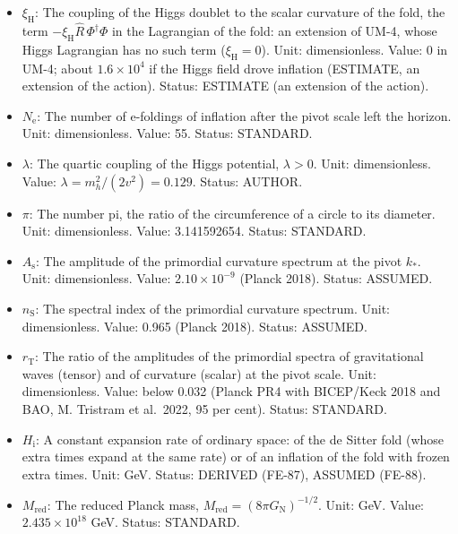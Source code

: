 \documentclass[
  10pt,
]{article}
\providecommand{\tightlist}{%
  \setlength{\itemsep}{0pt}\setlength{\parskip}{0pt}}
\begin{document}
\begin{itemize}
\tightlist
\item
  \(\xi_{\mathrm{H}}\): The coupling of the Higgs doublet to the scalar
  curvature of the fold, the term
  \(-\xi_{\mathrm{H}}\hat R\,\Phi^\dagger\Phi\) in the Lagrangian of the
  fold: an extension of UM-4, whose Higgs Lagrangian has no such term
  (\(\xi_{\mathrm{H}} = 0\)). Unit: dimensionless. Value: 0 in UM-4;
  about \(1.6\times10^4\) if the Higgs field drove inflation (ESTIMATE,
  an extension of the action). Status: ESTIMATE (an extension of the
  action).
\item
  \(N_{\mathrm{e}}\): The number of e-foldings of inflation after the
  pivot scale left the horizon. Unit: dimensionless. Value: 55. Status:
  STANDARD.
\item
  \(\lambda\): The quartic coupling of the Higgs potential,
  \(\lambda > 0\). Unit: dimensionless. Value:
  \(\lambda = m_h^2/(2v^2) = 0.129\). Status: AUTHOR.
\item
  \(\pi\): The number pi, the ratio of the circumference of a circle to
  its diameter. Unit: dimensionless. Value: 3.141592654. Status:
  STANDARD.
\item
  \(A_{\mathrm{s}}\): The amplitude of the primordial curvature spectrum
  at the pivot \(k_*\). Unit: dimensionless. Value:
  \(2.10\times10^{-9}\) (Planck 2018). Status: ASSUMED.
\item
  \(n_{\mathrm{S}}\): The spectral index of the primordial curvature
  spectrum. Unit: dimensionless. Value: 0.965 (Planck 2018). Status:
  ASSUMED.
\item
  \(r_{\mathrm{T}}\): The ratio of the amplitudes of the primordial
  spectra of gravitational waves (tensor) and of curvature (scalar) at
  the pivot scale. Unit: dimensionless. Value: below 0.032 (Planck PR4
  with BICEP/Keck 2018 and BAO, M. Tristram et al.~2022, 95 per cent).
  Status: STANDARD.
\item
  \(H_{\mathrm{i}}\): A constant expansion rate of ordinary space: of
  the de Sitter fold (whose extra times expand at the same rate) or of
  an inflation of the fold with frozen extra times. Unit: GeV. Status:
  DERIVED (FE-87), ASSUMED (FE-88).
\item
  \(M_{\mathrm{red}}\): The reduced Planck mass,
  \(M_{\mathrm{red}} = (8\pi G_{\mathrm{N}})^{-1/2}\). Unit: GeV. Value:
  \(2.435\times10^{18}\) GeV. Status: STANDARD.
\end{itemize}
\end{document}

